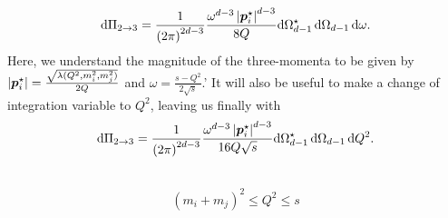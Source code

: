 \documentclass[../main.tex]{subfiles}
\begin{document}
            \begin{equation}
                \mathrm{d}\Pi_{2\to 3} = \frac{1}{\left(2\pi\right)^{2d-3}} \frac{\omega^{d-3} \left|\boldsymbol{p}_i^\star\right|^{d-3}}{8Q} \mathrm{d}\Omega_{d-1}^\star\, \mathrm{d}\Omega_{d-1}\, \mathrm{d}\omega.
            \end{equation}
            Here, we understand the magnitude of the three-momenta to be given by \(\left|\boldsymbol{p}_i^\star\right| = \frac{\sqrt{\lambda(Q^2, m_i^2, m_j^2)}}{2Q}\) and \(\omega = \frac{s-Q^2}{2\sqrt{s}}\).'
            It will also be useful to make a change of integration variable to \(Q^2\), leaving us finally with
            \begin{equation}
                \mathrm{d}\Pi_{2\to 3} = \frac{1}{\left(2\pi\right)^{2d-3}} \frac{\omega^{d-3} \left|\boldsymbol{p}_i^\star\right|^{d-3}}{16Q\sqrt{s}} \mathrm{d}\Omega_{d-1}^\star\, \mathrm{d}\Omega_{d-1}\, \mathrm{d}Q^2.
            \end{equation}

            \\
            \[(m_i + m_j)^2 \leq Q^2 \leq s\]
\end{document}
